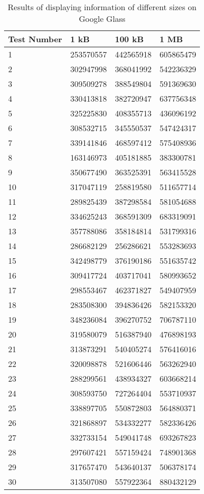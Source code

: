 	\begin{table}[ht!]
    		\caption{Results of displaying information of different sizes on Google Glass} \label{tab:distamceSmartphoneFull}
		\centering \begin{tabularx}{\textwidth}{l|X|X|X} \hline
		Test Number & \textbf{1 kB} & \textbf{100 kB} & \textbf{1 MB} \\ \hline \hline
		
		1&	253570557	&	442565918	&	605865479	\\ \hline
		2&	302947998	&	368041992	&	542236329	\\ \hline
		3&	309509278	&	388549804	&	591369630	\\ \hline
		4&	330413818	&	382720947	&	637756348	\\ \hline
		5&	325225830	&	408355713	&	436096192	\\ \hline
		6&	308532715	&	345550537	&	547424317	\\ \hline
		7&	339141846	&	468597412	&	575408936	\\ \hline
		8&	163146973	&	405181885	&	383300781	\\ \hline
		9&	350677490	&	363525391	&	563415528	\\ \hline
		10&	317047119	&	258819580	&	511657714	\\ \hline
		11&	289825439	&	387298584	&	581054688	\\ \hline
		12&	334625243	&	368591309	&	683319091	\\ \hline
		13&	357788086	&	358184814	&	531799316	\\ \hline
		14&	286682129	&	256286621	&	553283693	\\ \hline
		15&	342498779	&	376190186	&	551635742	\\ \hline
		16&	309417724	&	403717041	&	580993652	\\ \hline
		17&	298553467	&	462371827	&	549407959	\\ \hline
		18&	283508300	&	394836426	&	582153320	\\ \hline
		19&	348236084	&	396270752	&	706787110	\\ \hline
		20&	319580079	&	516387940	&	476898193	\\ \hline
		21&	313873291	&	540405274	&	576416016	\\ \hline
		22&	320098878	&	521606446	&	563262940	\\ \hline
		23&	288299561	&	438934327	&	603668214	\\ \hline
		24&	308593750	&	727264404	&	553710937	\\ \hline
		25&	338897705	&	550872803	&	564880371	\\ \hline
		26&	321868897	&	534332277	&	582336426	\\ \hline
		27&	332733154	&	549041748	&	693267823	\\ \hline
		28&	297607421	&	557159424	&	748901368	\\ \hline
		29&	317657470	&	543640137	&	506378174	\\ \hline
		30&	313507080	&	557922364	&	880432129	\\ \hline
		
		\end{tabularx}
	\end{table}

